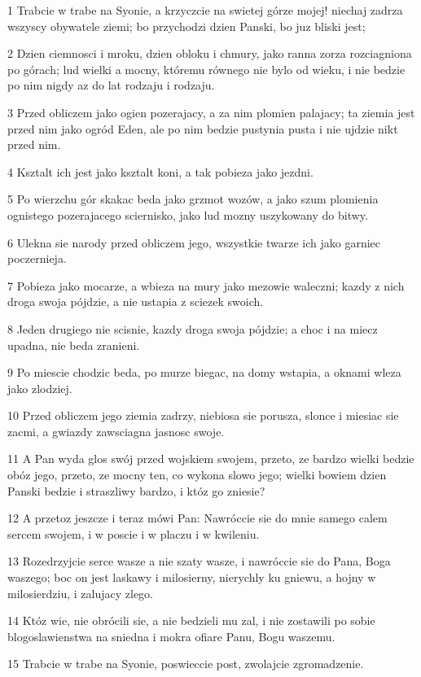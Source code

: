\par 1 Trabcie w trabe na Syonie, a krzyczcie na swietej górze mojej! niechaj zadrza wszyscy obywatele ziemi; bo przychodzi dzien Panski, bo juz bliski jest;
\par 2 Dzien ciemnosci i mroku, dzien obloku i chmury, jako ranna zorza rozciagniona po górach; lud wielki a mocny, któremu równego nie bylo od wieku, i nie bedzie po nim nigdy az do lat rodzaju i rodzaju.
\par 3 Przed obliczem jako ogien pozerajacy, a za nim plomien palajacy; ta ziemia jest przed nim jako ogród Eden, ale po nim bedzie pustynia pusta i nie ujdzie nikt przed nim.
\par 4 Ksztalt ich jest jako ksztalt koni, a tak pobieza jako jezdni.
\par 5 Po wierzchu gór skakac beda jako grzmot wozów, a jako szum plomienia ognistego pozerajacego sciernisko, jako lud mozny uszykowany do bitwy.
\par 6 Ulekna sie narody przed obliczem jego, wszystkie twarze ich jako garniec poczernieja.
\par 7 Pobieza jako mocarze, a wbieza na mury jako mezowie waleczni; kazdy z nich droga swoja pójdzie, a nie ustapia z sciezek swoich.
\par 8 Jeden drugiego nie scisnie, kazdy droga swoja pójdzie; a choc i na miecz upadna, nie beda zranieni.
\par 9 Po miescie chodzic beda, po murze biegac, na domy wstapia, a oknami wleza jako zlodziej.
\par 10 Przed obliczem jego ziemia zadrzy, niebiosa sie porusza, slonce i miesiac sie zacmi, a gwiazdy zawsciagna jasnosc swoje.
\par 11 A Pan wyda glos swój przed wojskiem swojem, przeto, ze bardzo wielki bedzie obóz jego, przeto, ze mocny ten, co wykona slowo jego; wielki bowiem dzien Panski bedzie i straszliwy bardzo, i któz go zniesie?
\par 12 A przetoz jeszcze i teraz mówi Pan: Nawróccie sie do mnie samego calem sercem swojem, i w poscie i w placzu i w kwileniu.
\par 13 Rozedrzyjcie serce wasze a nie szaty wasze, i nawróccie sie do Pana, Boga waszego; boc on jest laskawy i milosierny, nierychly ku gniewu, a hojny w milosierdziu, i zalujacy zlego.
\par 14 Któz wie, nie obrócili sie, a nie bedzieli mu zal, i nie zostawili po sobie blogoslawienstwa na sniedna i mokra ofiare Panu, Bogu waszemu.
\par 15 Trabcie w trabe na Syonie, poswieccie post, zwolajcie zgromadzenie.
